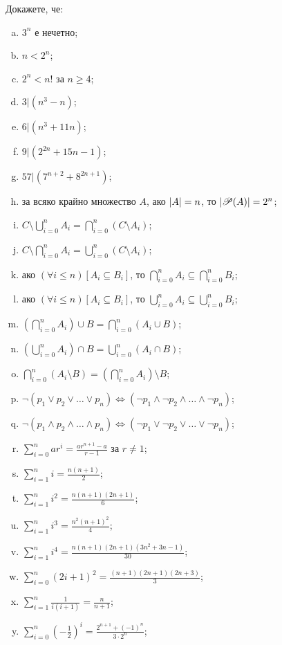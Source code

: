 \begin{problem}
  Докажете, че:
  \begin{enumerate}[a)]
  \item
    $3^n$ е нечетно;
  \item
    $n < 2^n$;
  \item
    $2^n < n!$ за $n \geq 4$;
  \item
    $3 \vert (n^3 - n)$;
  \item
    $6 \vert (n^3 + 11n)$;
  \item
    $9 \vert (2^{2n} + 15n - 1)$;
  \item
    $57 \vert (7^{n+2} + 8^{2n+1})$;
  \item
    за всяко крайно множество $A$,
    ако $\lvert{A}\rvert = n$, то $\lvert{\mathscr{P}(A)}\rvert = 2^n$;
  \item
    $C\setminus \bigcup^n_{i=0}A_i = \bigcap^n_{i=0}(C\setminus A_i)$;
  \item
    $C\setminus \bigcap^n_{i=0}A_i = \bigcup^n_{i=0}(C\setminus A_i)$;
  \item
    ако $(\forall i \leq n)[A_i \subseteq B_i]$, то
    $\bigcap^n_{i=0}A_i \subseteq \bigcap^n_{i=0}B_i$;
  \item
    ако $(\forall i \leq n)[A_i \subseteq B_i]$, то
    $\bigcup^n_{i=0}A_i \subseteq \bigcup^n_{i=0}B_i$;
  \item
    $(\bigcap^n_{i=0} A_i)\cup B = \bigcap^n_{i=0} (A_i\cup B)$;
  \item
    $(\bigcup^n_{i=0} A_i)\cap B = \bigcup^n_{i=0} (A_i\cap B)$;
  \item
    $\bigcap^n_{i=0} (A_i\setminus B) = (\bigcap^n_{i=0} A_i) \setminus B$;
  \item
    $\neg (p_1\vee p_2\vee\dots\vee p_n) \iff (\neg p_1 \wedge \neg p_2 \wedge\dots\wedge \neg p_n)$;
  \item
    $\neg (p_1\wedge p_2\wedge\dots\wedge p_n) \iff (\neg p_1 \vee \neg p_2 \vee \dots \vee \neg p_n)$;
  \item
    $\sum^n_{i=0} ar^i = \frac{ar^{n+1}-a}{r-1}$ за $r \neq 1$;
  \item
    $\sum^n_{i=1}i = \frac{n(n+1)}{2}$;
  \item
    $\sum^n_{i=1}i^2 = \frac{n(n+1)(2n+1)}{6}$;
  \item
    $\sum^n_{i=1}i^3 = \frac{n^2(n+1)^2}{4}$;
  \item
    $\sum^n_{i=1}i^4 = \frac{n(n+1)(2n+1)(3n^2+3n-1)}{30}$;
  \item
    $\sum^n_{i=0}(2i+1)^2 = \frac{(n+1)(2n+1)(2n+3)}{3}$;
  \item
    $\sum^n_{i=1}\frac{1}{i(i+1)} = \frac{n}{n+1}$;
  \item
    $\sum^n_{i=0}(-\frac{1}{2})^i = \frac{2^{n+1}+(-1)^n}{3\cdot 2^n}$;
  \end{enumerate}
\end{problem}

